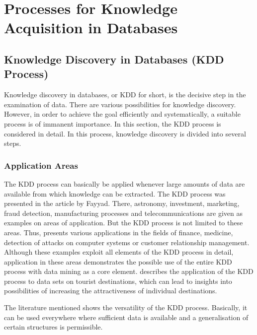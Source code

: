 %
%


\chapter{Processes for Knowledge Acquisition in Databases}

\section{Knowledge Discovery in Databases (KDD Process)}

Knowledge discovery in databases, or KDD for short, is the decisive step in the examination of data. There are various possibilities for knowledge discovery. However, in order to achieve the goal efficiently and systematically, a suitable process is of immanent importance. In this section, the KDD process is considered in detail. In this process, knowledge discovery is divided into several steps.  \cite{Dusing:2000}

\subsection{Application Areas}
The KDD process can basically be applied whenever large amounts of data are available from which knowledge can be extracted. The KDD process was presented in the article by Fayyad. \cite{Fayyad:1996}  There, astronomy, investment, marketing, fraud detection, manufacturing processes and telecommunications are given as examples on areas of application. But the KDD process is not limited to these areas. Thus, \cite{Maimon:2010} presents various applications in the fields of finance, medicine, detection of attacks on computer systems or customer relationship management. Although these examples exploit all elements of the KDD process in detail, application in these areas demonstrates the possible use of the entire KDD process with data mining as a core element. \cite{Pyo:2002} describes the application of the KDD process to data sets on tourist destinations, which can lead to insights into possibilities of increasing the attractiveness of individual destinations.

The literature mentioned shows the versatility of the KDD process. Basically, it can be used everywhere where sufficient data is available and a generalisation of certain structures is permissible. 


